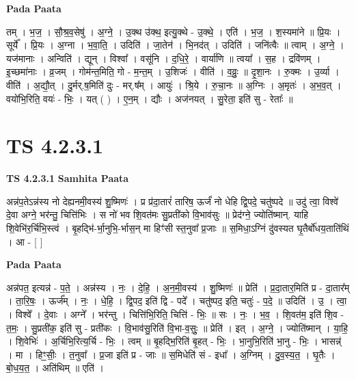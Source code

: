 \documentclass[17pt]{extarticle}
\begin{document}
\textbf{Pada Paata} \newline

तम् । भ॒ज॒ । सौ॒श्र॒व॒सेषु॑ । अ॒ग्ने॒ । उ॒क्थ उ॑क्थ॒ इत्यु॒क्थे - उ॒क्थे॒ । एति॑ । भ॒ज॒ । श॒स्यमा॑ने ॥ प्रि॒यः । सूर्ये᳚ । प्रि॒यः । अ॒ग्ना । भ॒वा॒ति॒ । उदिति॑ । जा॒तेन॑ । भि॒नद॑त् । उदिति॑ । जनि॑त्वैः ॥ त्वाम् । अ॒ग्ने॒ । यज॑मानाः । अन्विति॑ । द्यून् । विश्वा᳚ । वसू॑नि । द॒धि॒रे॒ । वार्या॑णि ॥ त्वया᳚ । स॒ह । द्रवि॑णम् । इ॒च्छमा॑नाः । व्र॒जम् । गोम॑न्त॒मिति॒ गो - म॒न्त॒म् । उ॒शिजः॑ । वीति॑ । व॒व्रुः॒ ॥ दृ॒शा॒नः । रु॒क्मः । उ॒र्व्या । वीति॑ । अ॒द्यौ॒त् । दु॒र्मर्.ष॒मिति॑ दुः - मर्.ष᳚म् । आयुः॑ । श्रि॒ये । रु॒चा॒नः ॥ अ॒ग्निः । अ॒मृतः॑ । अ॒भ॒व॒त् । वयो॑भि॒रिति॒ वयः॑ - भिः॒ । यत् ( ) । ए॒न॒म् । द्यौः । अज॑नयत् । सु॒रेता॒ इति॑ सु - रेताः᳚ ॥  \newline





\section{ TS 4.2.3.1 }

\textbf{TS 4.2.3.1 } \newline
\textbf{Samhita Paata} \newline

अन्न॑प॒तेऽन्न॑स्य नो देह्यनमी॒वस्य॑ शु॒ष्मिणः॑ । प्र प्र॑दा॒तारं॑ तारिष॒ ऊर्जं॑ नो धेहि द्वि॒पदे॒ चतु॑ष्पदे ॥ उदु॑ त्वा॒ विश्वे॑ दे॒वा अग्ने॒ भर॑न्तु॒ चित्ति॑भिः । स नो॑ भव शि॒वत॑मः सु॒प्रती॑को वि॒भाव॑सुः ॥ प्रेद॑ग्ने॒ ज्योति॑ष्मान्. याहि शि॒वेभि॑र॒र्चि॑भि॒स्त्वं । बृ॒हद्भि॑-र्भा॒नुभि॒-र्भास॒न् मा हिꣳ॑सी स्त॒नुवा᳚ प्र॒जाः ॥ स॒मिधा॒ऽग्निं दु॑वस्यत घृ॒तैर्बो॑धय॒ताति॑थिं । आ - [  ] \newline

\textbf{Pada Paata} \newline

अन्न॑पत॒ इत्यन्न॑ - प॒ते॒ । अन्न॑स्य । नः॒ । दे॒हि॒ । अ॒न॒मी॒वस्य॑ । शु॒ष्मिणः॑ ॥ प्रेति॑ । प्र॒दा॒तार॒मिति॑ प्र - दा॒तार᳚म् । ता॒रि॒षः॒ । ऊर्ज᳚म् । नः॒ । धे॒हि॒ । द्वि॒पद॒ इति॑ द्वि - पदे᳚ । चतु॑ष्पद॒ इति॒ चतुः॑ - प॒दे॒ ॥ उदिति॑ । उ॒ । त्वा॒ । विश्वे᳚ । दे॒वाः । अग्ने᳚ । भर॑न्तु । चित्ति॑भि॒रिति॒ चित्ति॑ - भिः॒ ॥ सः । नः॒ । भ॒व॒ । शि॒वत॑म॒ इति॑ शि॒व - त॒मः॒ । सु॒प्रती॑क॒ इति॑ सु - प्रती॑कः । वि॒भाव॑सु॒रिति॑ वि॒भा-व॒सुः॒ ॥ प्रेति॑ । इत् । अ॒ग्ने॒ । ज्योति॑ष्मान् । या॒हि॒ । शि॒वेभिः॑ । अ॒र्चिभि॒रित्य॒र्चि - भिः॒ । त्वम् ॥ बृ॒हद्भि॒रिति॑ बृ॒हत् - भिः॒ । भा॒नुभि॒रिति॑ भा॒नु - भिः॒ । भासन्न्॑ । मा । हिꣳ॒॒सीः॒ । त॒नुवा᳚ । प्र॒जा इति॑ प्र - जाः ॥ स॒मिधेति॑ सं - इधा᳚ । अ॒ग्निम् । दु॒व॒स्य॒त॒ । घृ॒तैः । बो॒ध॒य॒त॒ । अति॑थिम् ॥ एति॑ ।  \newline
\end{document}

